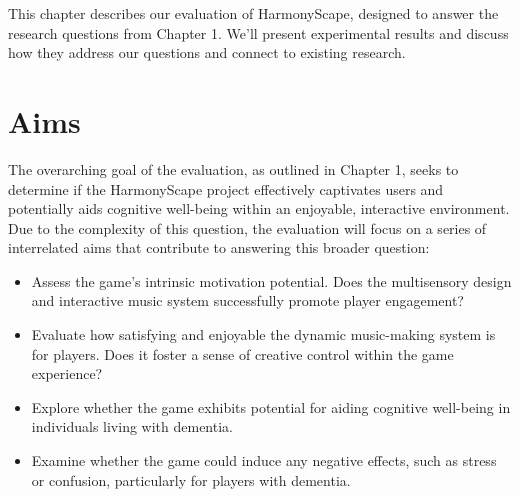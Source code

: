 \documentclass{l4proj}
\begin{document}

This chapter describes our evaluation of HarmonyScape, designed to answer the research questions from Chapter 1. We'll present experimental results and discuss how they address our questions and connect to existing research.

\section{Aims}
The overarching goal of the evaluation, as outlined in Chapter 1, seeks to determine if the HarmonyScape project effectively captivates users and potentially aids cognitive well-being within an enjoyable, interactive environment. Due to the complexity of this question, the evaluation will focus on a series of interrelated aims that contribute to answering this broader question:

\begin{itemize}
    \item Assess the game's intrinsic motivation potential. Does the multisensory design and interactive music system successfully promote player engagement?
    \item Evaluate how satisfying and enjoyable the dynamic music-making system is for players. Does it foster a sense of creative control within the game experience?
    \item Explore whether the game exhibits potential for aiding cognitive well-being in individuals living with dementia.
    \item Examine whether the game could induce any negative effects, such as stress or confusion, particularly for players with dementia.
\end{itemize}
\end{document}
